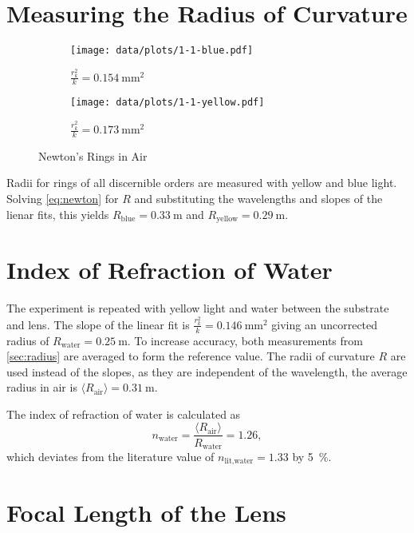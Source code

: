 \section{Measuring the Radius of Curvature}\label{sec:radius}

\begin{figure}[tbp]
	\centering
	\begin{subfigure}{.49\textwidth}
		\centering
		\texttt{[image: data/plots/1-1-blue.pdf]}
		\caption{Blue LED (\SI{465}{\nm})}
		\caption*{$\frac{r_k^2}{k} = \SI{0.154}{\mm\squared}$}
	\end{subfigure}
	\begin{subfigure}{.49\textwidth}
		\centering
		\texttt{[image: data/plots/1-1-yellow.pdf]}
		\caption{Yellow LED (\SI{590}{\nm})}
		\caption*{$\frac{r_k^2}{k} = \SI{0.173}{\mm\squared}$}
	\end{subfigure}
	\caption{Newton's Rings in Air}
\end{figure}

Radii for rings of all discernible orders are measured with yellow and blue light.
Solving \autoref{eq:newton} for $R$ and substituting the wavelengths and slopes of the lienar fits, this yields $R_\text{blue} = \SI{0.33}{\meter}$ and $R_\text{yellow} = \SI{0.29}{\meter}$.

\section{Index of Refraction of Water}

The experiment is repeated with yellow light and water between the substrate and lens.
The slope of the linear fit is $\frac{r_k^2}{k} = \SI{0.146}{\mm\squared}$ giving an uncorrected radius of $R_\text{water} = \SI{0.25}{\meter}$.
To increase accuracy, both measurements from \autoref{sec:radius} are averaged to form the reference value.
The radii of curvature $R$ are used instead of the slopes, as they are independent of the wavelength, the average radius in air is $\langle R_\text{air} \rangle = \SI{0.31}{\meter}$.

The index of refraction of water is calculated as
\begin{equation*}
	n_\text{water} = \frac{\langle R_\text{air} \rangle}{R_\text{water}} = \num{1.26},
\end{equation*}
which deviates from the literature value of $n_\text{lit,water} = \num{1.33}$ by \SI{5}{\percent}.

\section{Focal Length of the Lens}

